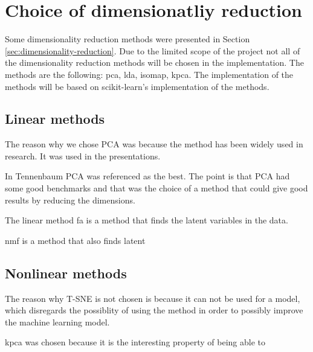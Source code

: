 \section{Choice of dimensionatliy reduction}\label{sec:choice-of-dimensionality-reduction}

Some dimensionality reduction methods were presented in Section \ref{sec:dimensionality-reduction}. Due to the limited scope of the project not all of the dimensionality reduction methods will be chosen in the implementation. The methods are the following: \gls{pca}, \gls{lda}, \gls{isomap}, \gls{kpca}. The implementation of the methods will be based on scikit-learn's implementation of the methods.


\subsection{Linear methods}
The reason why we chose PCA was because the method has been widely used in research. It was used in the presentations.


In Tennenbaum PCA was referenced as the best. The point is that PCA had some good benchmarks and that was the choice of a method that could give good results by reducing the dimensions.


The linear method \gls{fa} is a method that finds the latent variables in the data.


\gls{nmf} is a method that also finds latent

\subsection{Nonlinear methods}
The reason why T-SNE is not chosen is because it can not be used for a model, which disregards the possiblity of using the method in order to possibly improve the machine learning model.


\gls{kpca} was chosen because it is the interesting property of being able to 






